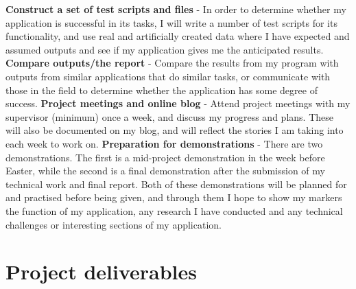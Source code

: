 \documentclass[11pt,fleqn,twoside]{article}
\begin{document}
\newline
\noindent
\textbf{Construct a set of test scripts and files} - In order to determine whether my application is successful in its tasks, I will write a number of test scripts for its functionality, and use real and artificially created data where I have expected and assumed outputs and see if my application gives me the anticipated results.
\newline
\noindent
\textbf{Compare outputs/the report} - Compare the results from my program with outputs from similar applications that do similar tasks, or communicate with those in the field to determine whether the application has some degree of success.
\newline
\noindent
\textbf{Project meetings and online blog} - Attend project meetings with my supervisor (minimum) once a week, and discuss my progress and plans. These will also be documented on my blog, and will reflect the stories I am taking into each week to work on.
\newline
\noindent
\textbf{Preparation for demonstrations} - There are two demonstrations. The first is a mid-project demonstration in the week before Easter, while the second is a final demonstration after the submission of my technical work and final report. Both of these demonstrations will be planned for and practised before being given, and through them I hope to show my markers the function of my application, any research I have conducted and any technical challenges or interesting sections of my application. 

\section{Project deliverables}
\end{document}
